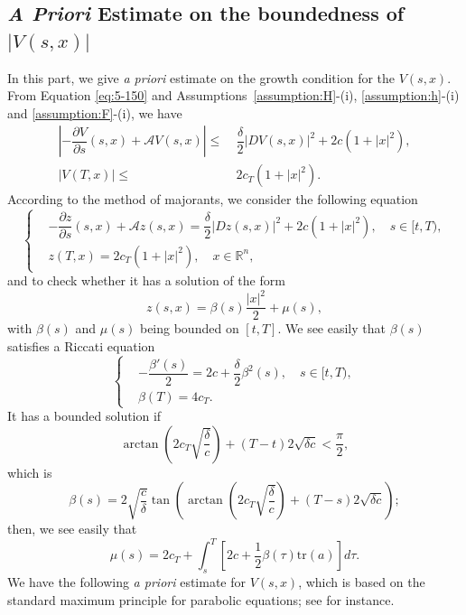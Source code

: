 \documentclass[11pt]{article}
\numberwithin{equation}{section}
\newcommand{\brn}{{\mathbb{R}^n}}
\newcommand{\1}{\mbox{1\hspace{-1mm}I}}
\begin{document}
\subsection{\textit{A Priori} Estimate on the boundedness of $|V(s,x)|$}\label{subsec:priori:V}

In this part, we give \textit{a priori} estimate on the growth condition for the $V(s,x)$.  From Equation \eqref{eq:5-150} and Assumptions~\ref{assumption:H}-(i), \ref{assumption:h}-(i) and \ref{assumption:F}-(i), we have 
\begin{equation}\label{eq:5-10}
    \begin{aligned}
        \left|-\dfrac{\partial V}{\partial s}(s,x)+\mathcal{A}V(s,x) \right| \le\ & \dfrac{\delta}{2}|DV(s,x)|^{2}+2c\left(1+|x|^{2}\right),\\
        |V(T,x)|\le\ &  2c_{T} \left(1+|x|^{2}\right).
    \end{aligned}
\end{equation}
According to the method of majorants, we consider the following equation 
\begin{equation}\label{eq:5-11}
    \left\{
    \begin{aligned}
        &-\dfrac{\partial z}{\partial s}(s,x)+\mathcal{A}z(s,x)=\dfrac{\delta}{2}|Dz(s,x)|^{2}+2c\left(1+|x|^{2}\right),\quad s\in[t,T),\\
        &z(T,x)=2 c_{T} \left(1+|x|^{2}\right),\quad x\in\brn,
    \end{aligned}
    \right.
\end{equation}
and to check whether it has a solution of the form 
\begin{equation}\label{eq:5-12}
    z(s,x)=\beta(s)\dfrac{|x|^{2}}{2}+\mu(s),
\end{equation}
with $\beta(s)$ and $\mu(s)$ being bounded on $[t,T]$. We see easily that $\beta(s)$ satisfies a Riccati equation 
\begin{equation*}
    \left\{
    \begin{aligned}
        &-\dfrac{\beta'(s)}{2}=2c+\dfrac{\delta}{2}\beta^{2}(s),\quad s\in[t,T),\\
        &\beta(T)=4 c_{T}. 
    \end{aligned}
    \right.
\end{equation*}
It has a bounded solution if 
\begin{equation}\label{eq:5-14}
    \arctan\left(2c_{T}\sqrt{\dfrac{\delta}{c}}\right) + (T-t)2\sqrt{\delta c}<\dfrac{\pi}{2},
\end{equation}
which is 
\begin{equation}\label{eq:5-15}
    \beta(s)=2\sqrt{\dfrac{c}{\delta}}\tan\left(\arctan\left(2c_{T}\sqrt{\dfrac{\delta}{c}} \right)+(T-s)2\sqrt{\delta c}\right);
\end{equation}
then, we see easily that 
\begin{equation}\label{eq:5-16}
    \mu(s)=2c_{T}+\int_{s}^{T}\left[2c+\dfrac{1}{2}\beta(\tau)\text{tr}(a)\right]d\tau. 
\end{equation}
We have the following \textit{a priori} estimate for $V(s,x)$, which is based on the standard maximum principle for parabolic equations; see \cite{9} for instance. 
\end{document}
